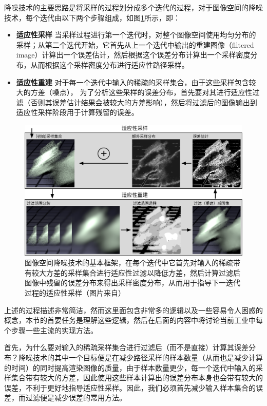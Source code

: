 降噪技术的主要思路是将采样的过程划分成多个迭代的过程，对于图像空间的降噪技术，每个迭代由以下两个步骤组成，如图\ref{f:pt-demoising}所示，即：

\begin{itemize}
	\item \textbf{适应性采样 } 当采样过程进行第一个迭代时，对整个图像空间使用均匀分布的采样；从第二个迭代开始，它首先从上一个迭代中输出的重建图像（filtered image）计算出一个误差估计，然后根据这个误差分布计算出一个采样密度分布，从而根据这个采样密度分布进行适应性路径采样。
	\item \textbf{适应性重建 } 对于每一个迭代中输入的稀疏的采样集合，由于这些采样包含较大的方差（噪点）， 为了分析这些采样的误差分布，首先要对其进行适应性过滤（否则其误差估计结果会被较大的方差影响），然后将过滤后的图像输出到适应性采样阶段用于计算残留的误差。
\end{itemize}

\begin{figure}
	\includegraphics[width=1.0\textwidth]{figures/pt/denoising}
	\caption{图像空间降噪技术的基本框架，在每个迭代中它首先对输入的稀疏带有较大方差的采样集合进行适应性过滤以降低方差，然后计算过滤后图像中残留的误差分布来得出采样密度分布，从而用于指导下一迭代过程的适应性采样（图片来自\cite{a:AdaptiveSamplingandReconstructionusingGreedyErrorMinimization}）}
	\label{f:pt-demoising}
\end{figure}

上述的过程描述非常简洁，然而这里面包含非常多的逻辑以及一些容易令人困惑的概念，本节的首要任务是理解这些逻辑，然后在后面的内容中将讨论当前工业中每个步骤一些主流的实现方法。

首先，为什么要对输入的稀疏采样集合进行过滤后（而不是直接）计算其误差分布？降噪技术的其中一个目标便是在减少路径采样的样本数量（从而也是减少计算的时间）的同时提高渲染图像的质量，由于样本数量更少，每一个迭代中输入的采样集合带有较大的方差，因此使用这些样本计算出的误差分布本身也会带有较大的误差，不利于更好地指导适应性采样。因此，我们必须首先减少输入样本集合的误差，而过滤便是减少误差的常用方法。

